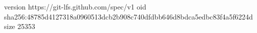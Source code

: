 version https://git-lfs.github.com/spec/v1
oid sha256:48785d4127318a0960513dcb2b908c740dfdbb646d8bdca5edbc83f4a5f6224d
size 25353
